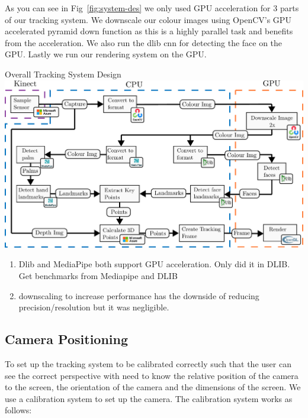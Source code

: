 As you can see in Fig~\ref{fig:system-des} we only used GPU acceleration for 3 parts of our tracking system. We downscale our colour images using OpenCV's GPU accelerated pyramid down function as this is a highly parallel task and benefits from the acceleration. We also run the dlib cnn for detecting the face on the GPU. Lastly we run our rendering system on the GPU.
\begin{figureBox}[label={fig:system-des}, width=1.0\linewidth]{Overall Tracking System Design}
    \includegraphics[width = 1.0\linewidth]{./implementation/figures/tracking-system.pdf}
\end{figureBox}

\begin{enumerate}[itemsep=-0.25em]
	\item Dlib and MediaPipe both support GPU acceleration. Only did it in DLIB. Get benchmarks from Mediapipe and DLIB
	\item downscaling to increase performance has the downside of reducing precision/resolution but it was negligible.
\end{enumerate}


\subsection{Camera Positioning}

To set up the tracking system to be calibrated correctly such that the user can see the correct perspective with need to know the relative position of the camera to the screen, the orientation of the camera and the dimensions of the screen. We use a calibration system to set up the camera. The calibration system works as follows:

